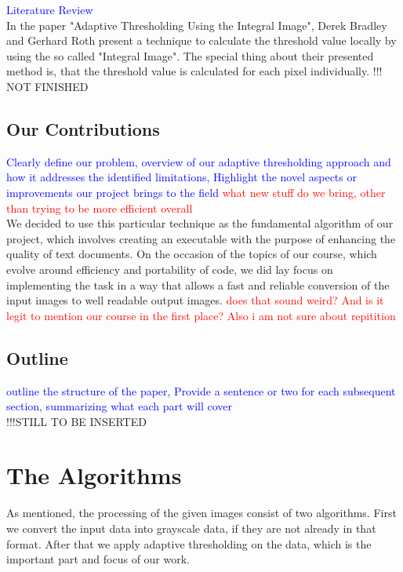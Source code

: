 \documentclass[sigconf]{acmart}
\begin{document}
\textcolor{blue}{Literature Review}\\

In the paper "Adaptive Thresholding Using the Integral Image", Derek Bradley and Gerhard Roth present a technique to calculate the threshold value locally by using the so called "Integral Image". The special thing about their presented method is, that the threshold value is calculated for each pixel individually. !!! NOT FINISHED


\subsection{Our Contributions}

\textcolor{blue}{Clearly define our problem, overview of our adaptive thresholding approach and how it addresses the identified limitations, Highlight the novel aspects or improvements our project brings to the field} \textcolor{red}{what new stuff do we bring, other than trying to be more efficient overall}\\

We decided to use this particular technique as the fundamental algorithm of our project, which involves creating an executable with the purpose of enhancing the quality of text documents. On the occasion of the topics of our course, which evolve around efficiency and portability of code, we did lay focus on implementing the task in a way that allows a fast and reliable conversion of the input images to well readable output images. \textcolor{red}{does that sound weird? And is it legit to mention our course in the first place? Also i am not sure about repitition}

\subsection{Outline}

\textcolor{blue}{outline the structure of the paper, Provide a sentence or two for each subsequent section, summarizing what each part will cover}\\

!!!STILL TO BE INSERTED


\section{The Algorithms}

As mentioned, the processing of the given images consist of two algorithms. First we convert the input data into grayscale data, if they are not already in that format. After that we apply adaptive thresholding on the data, which is the important part and focus of our work. 
\end{document}
